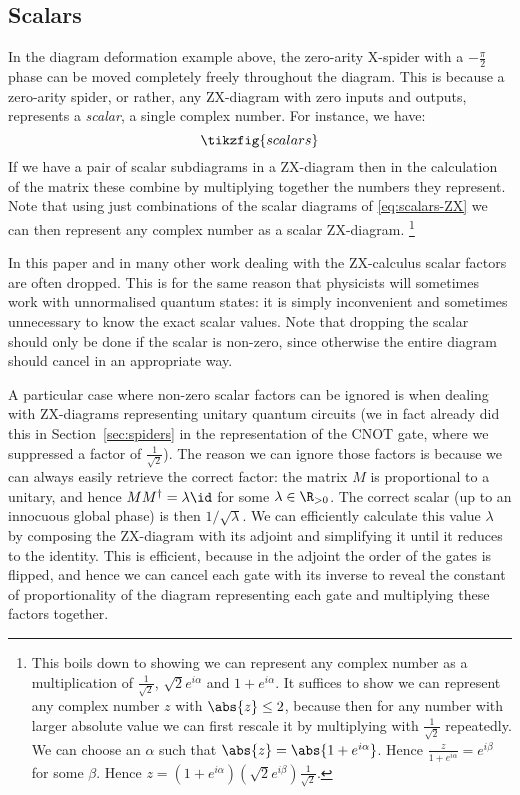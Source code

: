 \documentclass[a4paper,onecolumn,superscriptaddress,11pt,%
				unpublished,%
				allowfontchageintitle,%
				]{quantumarticle}
\begin{document}
\subsection{Scalars}\label{sec:scalars}
In the diagram deformation example above, the zero-arity X-spider with a $-\frac\pi2$ phase can be moved completely freely throughout the diagram. This is because a zero-arity spider, or rather, any ZX-diagram with zero inputs and outputs, represents a \emph{scalar}, a single complex number. For instance, we have:
\begin{equation}\label{eq:scalars-ZX}
\tikzfig{scalars}
\end{equation}
If we have a pair of scalar subdiagrams in a ZX-diagram then in the calculation of the matrix these combine by multiplying together the numbers they represent.
Note that using just combinations of the scalar diagrams of \eqref{eq:scalars-ZX} we can then represent any complex number as a scalar ZX-diagram.%
\footnote{This boils down to showing we can represent any complex number as a multiplication of $\frac{1}{\sqrt{2}}$, $\sqrt{2}e^{i\alpha}$ and $1+e^{i\alpha}$. It suffices to show we can represent any complex number $z$ with $\abs{z}\leq 2$, because then for any number with larger absolute value we can first rescale it by multiplying with $\frac{1}{\sqrt{2}}$ repeatedly. We can choose an $\alpha$ such that $\abs{z} = \abs{1+e^{i\alpha}}$. Hence $\frac{z}{1+e^{i\alpha}} = e^{i\beta}$ for some $\beta$. Hence $z = (1+e^{i\alpha})(\sqrt{2}e^{i\beta})\frac{1}{\sqrt{2}}$.}

In this paper and in many other work dealing with the ZX-calculus scalar factors are often dropped. This is for the same reason that physicists will sometimes work with unnormalised quantum states: it is simply inconvenient and sometimes unnecessary to know the exact scalar values. Note that dropping the scalar should only be done if the scalar is non-zero, since otherwise the entire diagram should cancel in an appropriate way.

A particular case where non-zero scalar factors can be ignored is when dealing with ZX-diagrams representing unitary quantum circuits (we in fact already did this in Section~\ref{sec:spiders} in the representation of the CNOT gate, where we suppressed a factor of $\frac{1}{\sqrt{2}}$). The reason we can ignore those factors is because we can always easily retrieve the correct factor: the matrix $M$ is proportional to a unitary, and hence $MM^\dagger = \lambda \id$ for some $\lambda\in \R_{>0}$. The correct scalar (up to an innocuous global phase) is then $1/\sqrt{\lambda}$. We can efficiently calculate this value $\lambda$ by composing the ZX-diagram with its adjoint and simplifying it until it reduces to the identity.  This is efficient, because in the adjoint the order of the gates is flipped, and hence we can cancel each gate with its inverse to reveal the constant of proportionality of the diagram representing each gate and multiplying these factors together.
\end{document}
